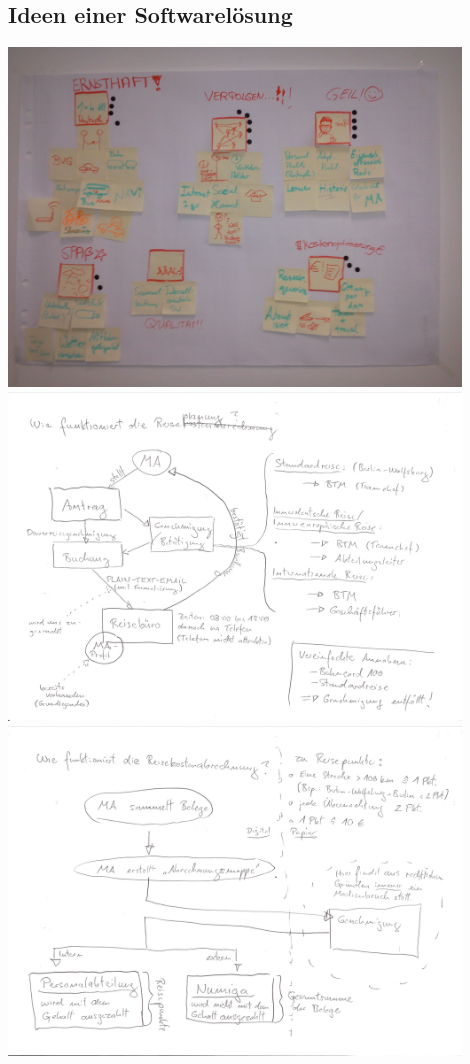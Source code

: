 \documentclass[12pt,a4paper]{article}
\begin{document}
\subsection{Ideen einer Softwarel\"osung}
\begin{center}
\includegraphics[width=12cm]{04_softwareloesung01.jpg}\\
\includegraphics[width=12cm]{04_softwareloesung02_001.jpg}\\
\includegraphics[width=12cm]{04_softwareloesung02_002.jpg}\\

\end{center}
\end{document}
